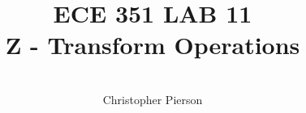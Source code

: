 



\documentclass[12pt]{article}

\usepackage[english]{babel}
\usepackage[utf8x]{inputenc}
\usepackage[T1]{fontenc}
\usepackage{graphicx}
\usepackage{amsmath}
\usepackage{caption}
\usepackage{float}
\usepackage{caption}
\usepackage{subcaption}
\usepackage{rotating}
\usepackage{setspace}

\usepackage[a4paper,top=3cm,bottom=2cm,left=3cm,right=3cm,marginparwidth=1.75cm]{geometry}

\usepackage[colorinlistoftodos]{todonotes}
\usepackage[colorlinks=true, allcolors=blue]{hyperref}
\usepackage{listings}
\usepackage{gensymb}
\usepackage{ mathrsfs }



\title{%
	\textbf{ ECE 351 LAB 11} \\
Z - Transform Operations 
	 }

\author{\\
	Christopher Pierson}

	
	
\vspace{\fill}
\maketitle
\vspace{\fill}
\clearpage

